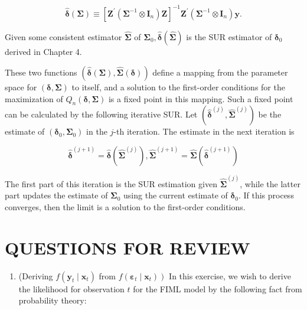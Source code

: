 \documentclass[10pt]{article}
\begin{document}
\begin{equation*}
\hat{\boldsymbol{\delta}}(\boldsymbol{\Sigma}) \equiv\left[\mathbf{Z}^{\prime}\left(\boldsymbol{\Sigma}^{-1} \otimes \mathbf{I}_{n}\right) \mathbf{Z}\right]^{-1} \mathbf{Z}^{\prime}\left(\boldsymbol{\Sigma}^{-1} \otimes \mathbf{I}_{n}\right) \mathbf{y} . \tag{8.5.32}
\end{equation*}


Given some consistent estimator $\widehat{\mathbf{\Sigma}}$ of $\mathbf{\Sigma}_{0}, \hat{\boldsymbol{\delta}}(\widehat{\mathbf{\Sigma}})$ is the SUR estimator of $\boldsymbol{\delta}_{0}$ derived in Chapter 4.

These two functions $(\hat{\boldsymbol{\delta}}(\boldsymbol{\Sigma}), \widehat{\boldsymbol{\Sigma}}(\boldsymbol{\delta}))$ define a mapping from the parameter space for $(\boldsymbol{\delta}, \boldsymbol{\Sigma})$ to itself, and a solution to the first-order conditions for the maximization of $Q_{n}(\boldsymbol{\delta}, \boldsymbol{\Sigma})$ is a fixed point in this mapping. Such a fixed point can be calculated by the following iterative SUR. Let $\left(\hat{\boldsymbol{\delta}}^{(j)}, \widehat{\mathbf{\Sigma}}^{(j)}\right)$ be the estimate of $\left(\boldsymbol{\delta}_{0}, \boldsymbol{\Sigma}_{0}\right)$ in the $j$-th iteration. The estimate in the next iteration is


\begin{equation*}
\hat{\boldsymbol{\delta}}^{(j+1)}=\hat{\boldsymbol{\delta}}\left(\widehat{\boldsymbol{\Sigma}}^{(j)}\right), \widehat{\boldsymbol{\Sigma}}^{(j+1)}=\widehat{\mathbf{\Sigma}}\left(\hat{\boldsymbol{\delta}}^{(j+1)}\right) \tag{8.5.33}
\end{equation*}


The first part of this iteration is the SUR estimation given $\widehat{\mathbf{\Sigma}}^{(j)}$, while the latter\\
part updates the estimate of $\boldsymbol{\Sigma}_{0}$ using the current estimate of $\boldsymbol{\delta}_{0}$. If this process converges, then the limit is a solution to the first-order conditions.

\section*{QUESTIONS FOR REVIEW}
\begin{enumerate}
  \item (Deriving $f\left(\mathbf{y}_{t} \mid \mathbf{x}_{t}\right)$ from $\left.f\left(\boldsymbol{\varepsilon}_{t} \mid \mathbf{x}_{t}\right)\right)$ In this exercise, we wish to derive the likelihood for observation $t$ for the FIML model by the following fact from probability theory:
\end{enumerate}
\end{document}
